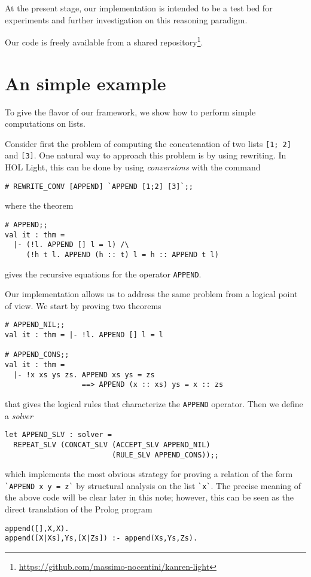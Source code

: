 At the present stage, our implementation is intended to be a test bed
for experiments and further investigation on this reasoning paradigm.

Our code is freely available from a shared
repository\footnote{\url{https://github.com/massimo-nocentini/kanren-light}}.

\section{An simple example}
\label{sec:an-simple-example}

To give the flavor of our framework, we show how to perform simple
computations on lists.

Consider first the problem of computing the concatenation of two lists
\verb|[1; 2]| and \verb|[3]|.  One natural way to approach this
problem is by using rewriting.  In HOL Light, this can be done by using
\emph{conversions} with the command
\begin{verbatim}
# REWRITE_CONV [APPEND] `APPEND [1;2] [3]`;;
\end{verbatim}
where the theorem
\begin{verbatim}
# APPEND;;
val it : thm =
  |- (!l. APPEND [] l = l) /\
     (!h t l. APPEND (h :: t) l = h :: APPEND t l)
\end{verbatim}
gives the recursive equations for the operator \verb|APPEND|.

Our implementation allows us to address the same problem from a
logical point of view.  We start by proving two theorems
\begin{verbatim}
# APPEND_NIL;;
val it : thm = |- !l. APPEND [] l = l

# APPEND_CONS;;
val it : thm =
  |- !x xs ys zs. APPEND xs ys = zs
                  ==> APPEND (x :: xs) ys = x :: zs
\end{verbatim}
that gives the logical rules that characterize the \verb|APPEND|
operator.  Then we define a \emph{solver}
\begin{verbatim}
let APPEND_SLV : solver =
  REPEAT_SLV (CONCAT_SLV (ACCEPT_SLV APPEND_NIL)
                         (RULE_SLV APPEND_CONS));;
\end{verbatim}
which implements the most obvious strategy for proving a relation of
the form \verb|`APPEND x y = z`| by structural analysis on the list
\verb|`x`|.  The precise meaning of the above code will be clear later
in this note; however, this can be seen as the direct translation of
the Prolog program
\begin{verbatim}
append([],X,X).
append([X|Xs],Ys,[X|Zs]) :- append(Xs,Ys,Zs).
\end{verbatim}

